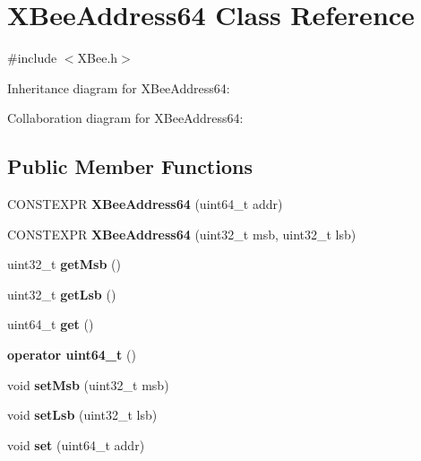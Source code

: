 \hypertarget{class_x_bee_address64}{}\section{X\+Bee\+Address64 Class Reference}
\label{class_x_bee_address64}


{\ttfamily \#include $<$X\+Bee.\+h$>$}



Inheritance diagram for X\+Bee\+Address64\+:


Collaboration diagram for X\+Bee\+Address64\+:
\subsection*{Public Member Functions}
\begin{DoxyCompactItemize}
\item 
\hypertarget{class_x_bee_address64_adaf36daf93ad256837c7a8d73ad1e15f}{}\label{class_x_bee_address64_adaf36daf93ad256837c7a8d73ad1e15f} 
C\+O\+N\+S\+T\+E\+X\+PR {\bfseries X\+Bee\+Address64} (uint64\+\_\+t addr)
\item 
\hypertarget{class_x_bee_address64_a74ed8e0f495864eb6daa44b3e75984dd}{}\label{class_x_bee_address64_a74ed8e0f495864eb6daa44b3e75984dd} 
C\+O\+N\+S\+T\+E\+X\+PR {\bfseries X\+Bee\+Address64} (uint32\+\_\+t msb, uint32\+\_\+t lsb)
\item 
\hypertarget{class_x_bee_address64_a45b6fd6840c54b9b0c171043bc188010}{}\label{class_x_bee_address64_a45b6fd6840c54b9b0c171043bc188010} 
uint32\+\_\+t {\bfseries get\+Msb} ()
\item 
\hypertarget{class_x_bee_address64_aafc931f117f53cccbf21d70e9eb31d5c}{}\label{class_x_bee_address64_aafc931f117f53cccbf21d70e9eb31d5c} 
uint32\+\_\+t {\bfseries get\+Lsb} ()
\item 
\hypertarget{class_x_bee_address64_a3239de44a52a6eb1089e2c2f92977b41}{}\label{class_x_bee_address64_a3239de44a52a6eb1089e2c2f92977b41} 
uint64\+\_\+t {\bfseries get} ()
\item 
\hypertarget{class_x_bee_address64_a6ab94eb9bf90cd2b2b74a0a46ed1e4ee}{}\label{class_x_bee_address64_a6ab94eb9bf90cd2b2b74a0a46ed1e4ee} 
{\bfseries operator uint64\+\_\+t} ()
\item 
\hypertarget{class_x_bee_address64_a35323c4cf8844715d0fc688ef0626352}{}\label{class_x_bee_address64_a35323c4cf8844715d0fc688ef0626352} 
void {\bfseries set\+Msb} (uint32\+\_\+t msb)
\item 
\hypertarget{class_x_bee_address64_a99a11e8801c87076ec816adeecf087ee}{}\label{class_x_bee_address64_a99a11e8801c87076ec816adeecf087ee} 
void {\bfseries set\+Lsb} (uint32\+\_\+t lsb)
\item 
\hypertarget{class_x_bee_address64_a85a79e29c9027f93a9b511be210ed0dd}{}\label{class_x_bee_address64_a85a79e29c9027f93a9b511be210ed0dd} 
void {\bfseries set} (uint64\+\_\+t addr)
\end{DoxyCompactItemize}



